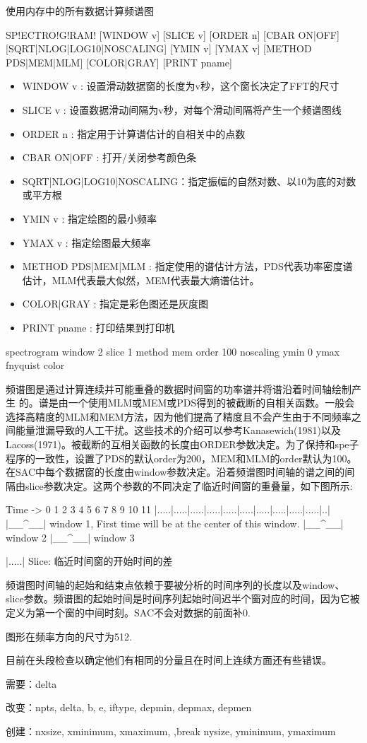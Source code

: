\label{cmd:spectrogram}

使用内存中的所有数据计算频谱图

\begin{SACSTX}
SP!ECTRO!G!RAM! [WINDOW v] [SLICE v] [ORDER n] [CBAR ON|OFF] 
    [SQRT|NLOG|LOG10|NOSCALING]
    [YMIN v] [YMAX v] [METHOD PDS|MEM|MLM] [COLOR|GRAY] 
    [PRINT pname]
\end{SACSTX}

\begin{itemize}
\item WINDOW v : 设置滑动数据窗的长度为v秒，这个窗长决定了FFT的尺寸 
\item SLICE v : 设置数据滑动间隔为v秒，对每个滑动间隔将产生一个频谱图线 
\item ORDER n : 指定用于计算谱估计的自相关中的点数 
\item CBAR ON|OFF : 打开/关闭参考颜色条 
\item SQRT|NLOG|LOG10|NOSCALING：指定振幅的自然对数、以10为底的对数或平方根
\item YMIN v : 指定绘图的最小频率  
\item YMAX v : 指定绘图最大频率 
\item METHOD PDS|MEM|MLM : 指定使用的谱估计方法，PDS代表功率密度谱估计，MLM代表最大似然，MEM代表最大熵谱估计。  
\item COLOR|GRAY : 指定是彩色图还是灰度图 
\item PRINT pname : 打印结果到打印机  
\end{itemize}

\begin{SACDFT}
spectrogram window 2 slice 1 method mem order 100 noscaling
    ymin 0 ymax fnyquist color
\end{SACDFT}

频谱图是通过计算连续并可能重叠的数据时间窗的功率谱并将谱沿着时间轴绘制产生	的。谱是由一个使用MLM或MEM或PDS得到的被截断的自相关函数。一般会选择高精度的MLM和MEM方法，因为他们提高了精度且不会产生由于不同频率之间能量泄漏导致的人工干扰。这些技术的介绍可以参考Kanasewich(1981)以及Lacoss(1971)。被截断的互相关函数的长度由ORDER参数决定。为了保持和spe子程序的一致性，设置了PDS的默认order为200，MEM和MLM的order默认为100。在SAC中每个数据窗的长度由window参数决定。沿着频谱图时间轴的谱之间的间隔由slice参数决定。这两个参数的不同决定了临近时间窗的重叠量，如下图所示:
\begin{SACCode}
Time ->
0  1  2  3  4  5  6  7  8  9 10 11
|.....|.....|.....|.....|.....|.....|.....|.....|.....|.....|..|
|__^__| window 1, First time will be at the center of this window.
      |__^__| window 2
            |__^__| window 3

|.....| Slice: 临近时间窗的开始时间的差
\end{SACCode}
频谱图时间轴的起始和结束点依赖于要被分析的时间序列的长度以及window、slice参数。频谱图的起始时间是时间序列起始时间迟半个窗对应的时间，因为它被定义为第一个窗的中间时刻。SAC不会对数据的前面补0.

图形在频率方向的尺寸为512.

目前在头段检查以确定他们有相同的分量且在时间上连续方面还有些错误。

需要：delta

改变：npts, delta, b, e, iftype, depmin, depmax, depmen

创建：nxsize, xminimum, xmaximum, ,break nysize, yminimum, ymaximum
